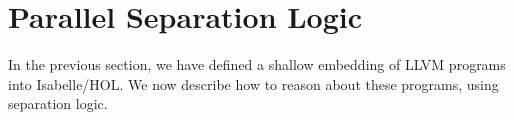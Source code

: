 \documentclass[a4paper,UKenglish,cleveref, autoref, thm-restate]{lipics-v2021}
\begin{document}
%
%
%
%
%
%

  \section{Parallel Separation Logic}\label{sec:seplogic}
  In the previous section, we have defined a shallow embedding of LLVM programs into Isabelle/HOL.
  We now describe how to reason about these programs, using separation logic.
\end{document}
